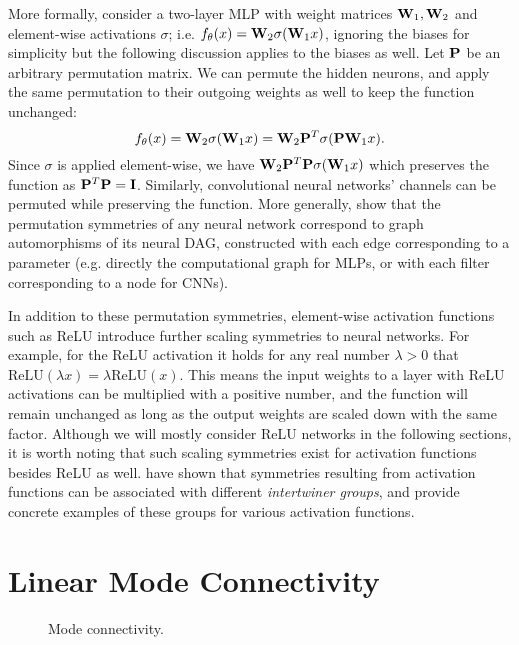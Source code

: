 More formally, consider a two-layer MLP with weight matrices $\mathbf{W}_1, \mathbf{W}_2$ and element-wise activations $\sigma$; i.e. $f_\theta(x) = \mathbf{W}_2 \sigma (\mathbf{W}_1x)$, ignoring the biases for simplicity but the following discussion applies to the biases as well. Let $\mathbf{P}$ be an arbitrary permutation matrix. We can permute the hidden neurons, and apply the same permutation to their outgoing weights as well to keep the function unchanged:
\begin{equation}
    f_\theta(x) = \mathbf{W}_2 \sigma (\mathbf{W}_1x) = \mathbf{W}_2 \mathbf{P}^T \sigma (\mathbf{P} \mathbf{W}_1x).
\end{equation}
Since $\sigma$ is applied element-wise, we have $\mathbf{W}_2 \mathbf{P}^T  \mathbf{P} \sigma (\mathbf{W}_1x)$ which preserves the function as $\mathbf{P}^T  \mathbf{P} = \mathbf{I}$. Similarly, convolutional neural networks' channels can be permuted while preserving the function. More generally, \citet{limGraphMetanetworksProcessing2023} show that the permutation symmetries of any neural network correspond to graph automorphisms of its neural DAG, constructed with each edge corresponding to a parameter (e.g. directly the computational graph for MLPs, or with each filter corresponding to a node for CNNs).

In addition to these permutation symmetries, element-wise activation functions such as ReLU introduce further scaling symmetries to neural networks. For example, for the ReLU activation it holds for any real number $\lambda > 0$ that $\text{ReLU}(\lambda x) = \lambda \text{ReLU}(x)$. This means the input weights to a layer with ReLU activations can be multiplied with a positive number, and the function will remain unchanged as long as the output weights are scaled down with the same factor. Although we will mostly consider ReLU networks in the following sections, it is worth noting that such scaling symmetries exist for activation functions besides ReLU as well. \citep{godfreySymmetriesDeepLearning2022} have shown that symmetries resulting from activation functions can be associated with different \textit{intertwiner groups}, and provide concrete examples of these groups for various activation functions. 

\section{Linear Mode Connectivity}

\begin{figure}[t!]
    \caption{\label{fig:mode_conn} Mode connectivity.}    
\end{figure}


